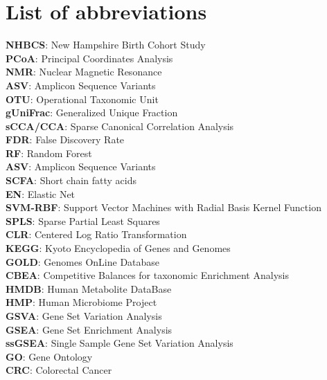 \chapter{List of abbreviations}

\noindent \textbf{NHBCS}: New Hampshire Birth Cohort Study \\
\noindent \textbf{PCoA}: Principal Coordinates Analysis \\
\noindent \textbf{NMR}: Nuclear Magnetic Resonance \\
\noindent \textbf{ASV}: Amplicon Sequence Variants \\
\noindent \textbf{OTU}: Operational Taxonomic Unit \\
\noindent \textbf{gUniFrac}: Generalized Unique Fraction \\
\noindent \textbf{sCCA/CCA}: Sparse Canonical Correlation Analysis \\
\noindent \textbf{FDR}: False Discovery Rate \\
\noindent \textbf{RF}: Random Forest \\
\noindent \textbf{ASV}: Amplicon Sequence Variants \\
\noindent \textbf{SCFA}: Short chain fatty acids \\
\noindent \textbf{EN}: Elastic Net \\
\noindent \textbf{SVM-RBF}: Support Vector Machines with Radial Basis Kernel Function \\
\noindent \textbf{SPLS}: Sparse Partial Least Squares \\
\noindent \textbf{CLR}: Centered Log Ratio Transformation \\ 
\noindent \textbf{KEGG}: Kyoto Encyclopedia of Genes and Genomes \\
\noindent \textbf{GOLD}: Genomes OnLine Database \\
\noindent \textbf{CBEA}: Competitive Balances for taxonomic Enrichment Analysis \\
\noindent \textbf{HMDB}: Human Metabolite DataBase \\
\noindent \textbf{HMP}: Human Microbiome Project \\
\noindent \textbf{GSVA}: Gene Set Variation Analysis \\
\noindent \textbf{GSEA}: Gene Set Enrichment Analysis \\
\noindent \textbf{ssGSEA}: Single Sample Gene Set Variation Analysis \\
\noindent \textbf{GO}: Gene Ontology \\
\noindent \textbf{CRC}: Colorectal Cancer \\
